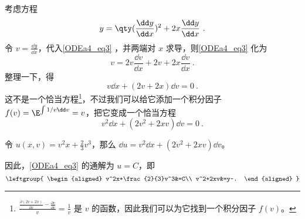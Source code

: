 \begin{example}{}\label{ODEa4_ex2}


考虑方程
\begin{equation}\label{ODEa4_eq3}
y=\qty(\frac{\dd y}{\dd x})^2+2x\frac{\dd y}{\dd x}~.
\end{equation}
令 $v=\frac{\dd y}{\dd x}$，代入\autoref{ODEa4_eq3} ，并两端对 $x$ 求导，则\autoref{ODEa4_eq3} 化为
\begin{equation}
v=2v\frac{\dd v}{\dd x}+2v+2x\frac{\dd v}{\dd x}~.
\end{equation}
整理一下，得
\begin{equation}
v\dd x+(2v+2x)\dd v=0~.
\end{equation}
这不是一个恰当方程\footnote{$\frac{\frac{\partial (2v+2x)}{\partial x}-\frac{\partial v}{\partial v}}{v}=\frac{1}{v}$ 是 $v$ 的函数，因此我们可以为它找到一个积分因子 $f(v)$。}，不过我们可以给它添加一个积分因子 $f(v)=\E^{\int 1/v \dd v}=v$，把它变成一个恰当方程
\begin{equation}
v^2\dd x+(2v^2+2xv)\dd v=0~.
\end{equation}

令 $u(x, v)=v^2x+\frac{2}{3}v^3$，那么 $\dd u=v^2\dd x+(2v^2+2xv)\dd v$。

因此，\autoref{ODEa4_eq3} 的通解为 $u=C$，即
\begin{equation}
\leftgroup{
    \begin{aligned}
    v^2x+\frac{2}{3}v^3&=C\\
    v^2+2xv&=y~.
    \end{aligned}
}
\end{equation}



\end{example}


